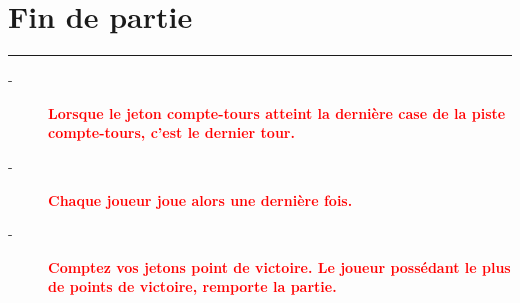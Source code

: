 \documentclass{scrartcl}%
\begin{document}
\section{ Fin de partie
}%
\label{sec:Findepartie}%
\textcolor{red}{\rule{18cm}{0.07cm}}\break%
\begin{description}%
\item[{-} ]%
%
\textcolor{red}{%
\textbf{Lorsque le jeton compte{-}tours atteint la dernière case de la piste compte{-}tours, c’est le dernier tour.}%
}%

%
\item[{-} ]%
%
\textcolor{red}{%
\textbf{Chaque joueur joue alors une dernière fois.}%
}%

%
\item[{-} ]%
%
\textcolor{red}{%
\textbf{Comptez vos jetons point de victoire. Le joueur possédant le plus de points de victoire, remporte la partie.}%
}%
\end{description}

%
\end{document}
